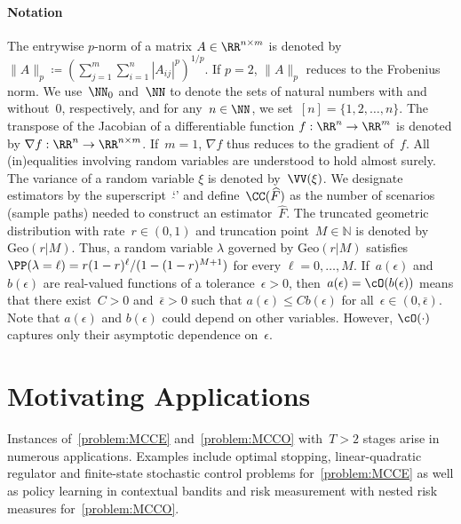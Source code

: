 \documentclass[11pt]{article}
\let\hat\widehat
\begin{document}
\paragraph{Notation} The entrywise $p$-norm of a matrix $A\in\RR^{n\times m}$ is denoted by $\|A\|_p \coloneqq (\sum_{j=1}^m\sum_{i=1}^n| A_{ij}|^p)^{1/p}$. If $p=2$, $\|A\|_p$ reduces to the Frobenius norm. We use~$\NN_0$ and~$\NN$ to denote the sets of natural numbers with and without~$0$, respectively, and for any~$n\in\NN$, we set~$[n]=\{1,2,\ldots,n\}$. The transpose of the Jacobian of a differentiable function $f:\RR^n\rightarrow \RR^m$ is denoted by $\nabla f:\RR^n\rightarrow \RR^{n\times m}$. If~$m=1$, $\nabla f$ thus reduces to the gradient of~$f$. All (in)equalities involving random variables are understood to hold almost surely. The variance of a random variable $\xi$ is denoted by~$\VV(\xi)$. We designate estimators by the superscript~‘\;$\hat{}$\;’ and define~$\CC(\hat{F})$ as the number of scenarios (sample paths) needed to construct an estimator~$\hat{F}$. The truncated geometric distribution with rate~$r\in(0,1)$ and truncation point~$M\in\mathbb N$ is denoted by~$\text{Geo}(r|M)$. Thus, a random variable $\lambda$ governed by $\text{Geo}(r|M)$ satisfies $\PP(\lambda=\ell)=r(1-r)^\ell /(1-(1-r)^{M+1})$ for every $\ell=0,\ldots, M$. If~$a(\epsilon)$ and~$b(\epsilon)$ are real-valued functions of a tolerance~$\epsilon>0$, then~$a(\epsilon)=\cO(b(\epsilon))$ means that there exist~$C>0$ and~$\bar\epsilon>0$ such that $a(\epsilon)\leq C b(\epsilon)$ for all~$\epsilon\in(0,\bar\epsilon)$. Note that $a(\epsilon)$ and $b(\epsilon)$ could depend on other variables. However, $\cO(\cdot)$ captures only their asymptotic dependence on~$\epsilon$. 


\section{Motivating Applications}
\label{sec:motivational_ex}
Instances of~\eqref{problem:MCCE} and~\eqref{problem:MCCO} with~$T>2$ stages arise in numerous applications. Examples include optimal stopping, linear-quadratic regulator and finite-state stochastic control problems for~\eqref{problem:MCCE} as well as policy learning in contextual bandits and risk measurement with nested risk measures for~\eqref{problem:MCCO}.
\end{document}

